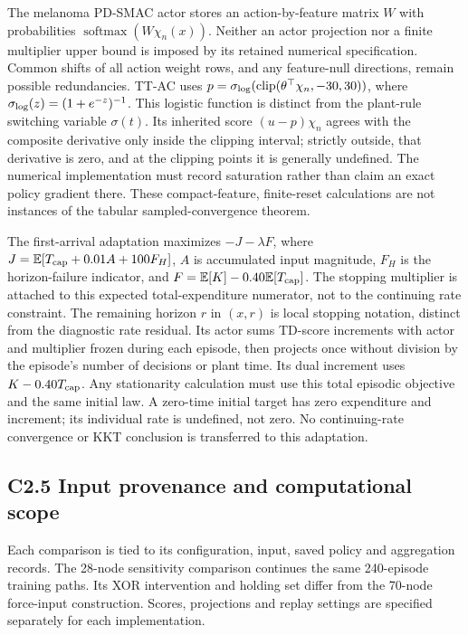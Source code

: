 \documentclass[11pt]{article}
\newcommand{\E}{\mathbb{E}}
\newcommand{\1}{\mathbf{1}}
\begin{document}
The melanoma PD-SMAC actor stores an action-by-feature matrix $W$ with probabilities $\operatorname{softmax}(W\chi_n(x))$. Neither an actor projection nor a finite multiplier upper bound is imposed by its retained numerical specification. Common shifts of all action weight rows, and any feature-null directions, remain possible redundancies. TT-AC uses $p=\sigma_{\rm log}(\operatorname{clip}(\theta^\top\chi_n,-30,30))$, where $\sigma_{\rm log}(z)=(1+e^{-z})^{-1}$. This logistic function is distinct from the plant-rule switching variable $\sigma(t)$. Its inherited score $(u-p)\chi_n$ agrees with the composite derivative only inside the clipping interval; strictly outside, that derivative is zero, and at the clipping points it is generally undefined. The numerical implementation must record saturation rather than claim an exact policy gradient there. These compact-feature, finite-reset calculations are not instances of the tabular sampled-convergence theorem.

The first-arrival adaptation maximizes $-J-\lambda F$, where $J=\E[T_{\rm cap}+0.01A+100F_H]$, $A$ is accumulated input magnitude, $F_H$ is the horizon-failure indicator, and $F=\E[K]-0.40\E[T_{\rm cap}]$. The stopping multiplier is attached to this expected total-expenditure numerator, not to the continuing rate constraint. The remaining horizon $r$ in $(x,r)$ is local stopping notation, distinct from the diagnostic rate residual. Its actor sums TD-score increments with actor and multiplier frozen during each episode, then projects once without division by the episode's number of decisions or plant time. Its dual increment uses $K-0.40T_{\rm cap}$. Any stationarity calculation must use this total episodic objective and the same initial law. A zero-time initial target has zero expenditure and increment; its individual rate is undefined, not zero. No continuing-rate convergence or KKT conclusion is transferred to this adaptation.

\subsection*{C2.5 Input provenance and computational scope}
\label{comp:sec:provenance}
Each comparison is tied to its configuration, input, saved policy and aggregation records. The 28-node sensitivity comparison continues the same 240-episode training paths. Its XOR intervention and holding set differ from the 70-node force-input construction. Scores, projections and replay settings are specified separately for each implementation.
\end{document}
